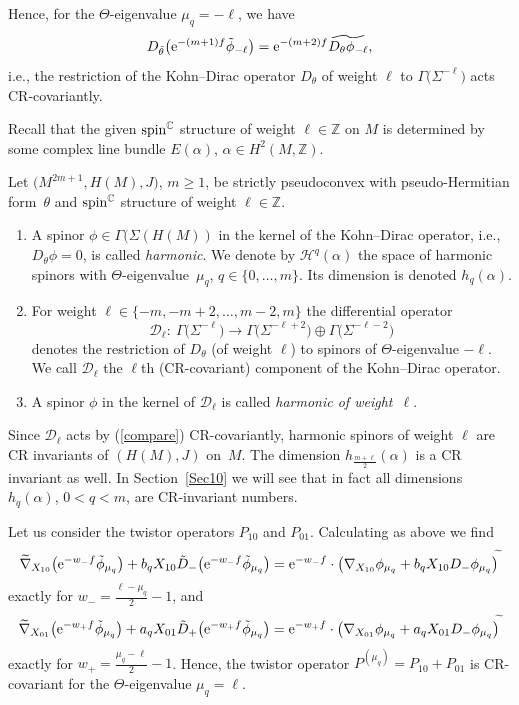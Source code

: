 \documentclass[pdftex]{sigma}
\numberwithin{equation}{section}
\newcommand{\ZZ}{\mathbb{Z}}
\newcommand{\CC}{\mathbb{C}}
\begin{document}
Hence, for the $\Theta$-eigenvalue $\mu_q=-\ell$, we have
\begin{equation}\label{compare}
D_{\tilde{\theta}}\big({\rm e}^{-(m+1)f}\tilde{\phi}_{-\ell}\big) = {\rm e}^{-(m+2)f} \widetilde{D_\theta\phi_{-\ell}},
\end{equation}
i.e., the restriction of the Kohn--Dirac operator $D_\theta$ of weight $\ell$ to $\Gamma\big(\Sigma^{-\ell}\big)$ acts CR-covariantly.

Recall that the given ${\rm spin}^\CC$ structure of weight $\ell\in\ZZ$ on $M$ is determined by some complex line bundle $E(\alpha)$, $\alpha\in H^2(M,\ZZ)$.

\begin{Definition} Let $\big(M^{2m+1},H(M),J\big)$, $m\geq 1$, be strictly pseudoconvex
with pseudo-Her\-mi\-tian form~$\theta$ and ${\rm spin}^\CC$ structure of weight $\ell\in\ZZ$.\samepage
\begin{enumerate}\itemsep=0pt
\item[(a)] A spinor $\phi\in\Gamma(\Sigma(H(M))$ in the kernel of the Kohn--Dirac operator, i.e., $D_\theta\phi=0$,
is called \emph{harmonic}. We denote by $\mathcal{H}^{q}(\alpha)$ the space of harmonic spinors
with $\Theta$-eigenvalue~$\mu_q$, $q\in\{0,\dots,m\}$. Its dimension is denoted $h_{q}(\alpha)$.
\item[(b)] For weight $\ell\in\{-m,-m+2,\dots,m-2,m\}$ the differential operator
\[
\mathcal{D}_\ell\colon \ \Gamma\big(\Sigma^{-\ell}\big) \to \Gamma\big(\Sigma^{-\ell+2}\big)\oplus\Gamma\big(\Sigma^{-\ell-2}\big)
\]
denotes the restriction of $D_\theta$ (of weight $\ell$) to spinors of $\Theta$-eigenvalue $-\ell$.
We call $\mathcal{D}_\ell$ the $\ell$th (CR-covariant) component of the Kohn--Dirac operator.
\item[(c)] A spinor $\phi$ in the kernel of $\mathcal{D}_\ell$ is called \emph{harmonic of weight~$\ell$}.
\end{enumerate}
\end{Definition}

Since $\mathcal{D}_\ell$ acts by (\ref{compare}) CR-covariantly,
harmonic spinors of weight $\ell$ are CR invariants of $(H(M),J)$ on~$M$.
The dimension $h_{\frac{m+\ell}{2}}(\alpha)$ is a CR invariant as well.
In Section~\ref{Sec10} we will see that in fact all dimensions $h_{q}(\alpha)$, $0<q<m$, are CR-invariant numbers.

Let us consider the twistor operators $P_{10}$ and $P_{01}$. Calculating as above we find
\[\widetilde{\nabla}_{X_{10}}\big({\rm e}^{-w_-f}\tilde{\phi}_{\mu_q}\big)+b_qX_{10}\tilde{D}_-\big({\rm e}^{-w_-f}\tilde{\phi}_{\mu_q}\big) =
{\rm e}^{-w_-f}\cdot\big(\nabla_{X_{10}}\phi_{\mu_q}+b_qX_{10}D_-\phi_{\mu_q}\big)^{\widetilde{}}\]
exactly for $w_-=\frac{\ell-\mu_q}{2}-1$, and
\[\widetilde{\nabla}_{X_{01}}\big({\rm e}^{-w_+f}\tilde{\phi}_{\mu_q}\big)+a_qX_{01}\tilde{D}_+\big({\rm e}^{-w_+f}\tilde{\phi}_{\mu_q}\big) =
{\rm e}^{-w_+f}\cdot\big(\nabla_{X_{01}}\phi_{\mu_q}+a_qX_{01}D_-\phi_{\mu_q}\big)^{\widetilde{}}\]
exactly for $w_+=\frac{\mu_q-\ell}{2}-1$.
Hence, the twistor operator $P^{(\mu_q)}=P_{10}+P_{01}$ is CR-covariant for the $\Theta$-eigenvalue $\mu_q=\ell$.
\end{document}
